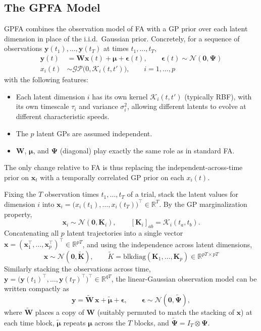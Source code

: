 \documentclass[11pt]{article}
\begin{document}
\subsection*{The GPFA Model}

GPFA combines the observation model of FA with a GP prior over each latent dimension in place of the i.i.d.\ Gaussian prior. Concretely, for a sequence of observations $\mathbf{y}(t_1), \dots, \mathbf{y}(t_T)$ at times $t_1, \dots, t_T$,
\[
\begin{aligned}
\mathbf{y}(t) &= \mathbf{W} \mathbf{x}(t) + \boldsymbol{\mu} + \boldsymbol{\epsilon}(t), \qquad \boldsymbol{\epsilon}(t) \sim \mathcal{N}(\mathbf{0}, \boldsymbol{\Psi}) \\
x_i(t) &\sim \mathcal{GP}\big(0, \mathcal{K}_i(t,t')\big), \qquad i = 1, \dots, p
\end{aligned}
\]
with the following features:
\begin{itemize}
    \item Each latent dimension $i$ has its own kernel $\mathcal{K}_i(t,t')$ (typically RBF), with its own timescale $\tau_i$ and variance $\sigma_i^2$, allowing different latents to evolve at different characteristic speeds.
    \item The $p$ latent GPs are assumed independent.
    \item $\mathbf{W}$, $\boldsymbol{\mu}$, and $\boldsymbol{\Psi}$ (diagonal) play exactly the same role as in standard FA.
\end{itemize}
The only change relative to FA is thus replacing the independent-across-time prior on $\mathbf{x}_t$ with a temporally correlated GP prior on each $x_i(t)$.

Fixing the $T$ observation times $t_1,\dots,t_T$ of a trial, stack the latent values for dimension $i$ into $\mathbf{x}_i = \big(x_i(t_1), \dots, x_i(t_T)\big)^\top \in \mathbb{R}^T$. By the GP marginalization property,
\[
    \mathbf{x}_i \sim \mathcal{N}(\mathbf{0}, \mathbf{K}_i), \qquad [\mathbf{K}_i]_{ab} = \mathcal{K}_i(t_a, t_b).
\]
Concatenating all $p$ latent trajectories into a single vector $\mathbf{x} = (\mathbf{x}_1^\top, \dots, \mathbf{x}_p^\top)^\top \in \mathbb{R}^{pT}$, and using the independence across latent dimensions,
\[
    \mathbf{x} \sim \mathcal{N}(\mathbf{0}, \tilde{\mathbf{K}}), \qquad \tilde{K} = \mathrm{blkdiag}(\mathbf{K}_1, \dots, \mathbf{K}_p) \in \mathbb{R}^{pT \times pT}
\]
Similarly stacking the observations across time, $\mathbf{y} = \big(\mathbf{y}(t_1)^\top, \dots, \mathbf{y}(t_T)^\top\big)^\top \in \mathbb{R}^{qT}$, the linear-Gaussian observation model can be written compactly as
\[
    \mathbf{y} = \tilde{\mathbf{W}}\, \mathbf{x} + \tilde{\boldsymbol{\mu}} + \boldsymbol{\epsilon}, \qquad \boldsymbol{\epsilon} \sim \mathcal{N}(\mathbf{0}, \tilde{\boldsymbol{\Psi}}),
\]
where $\tilde{\mathbf{W}}$ places a copy of $\mathbf{W}$ (suitably permuted to match the stacking of $\mathbf{x}$) at each time block, $\tilde{\boldsymbol{\mu}}$ repeats $\boldsymbol{\mu}$ across the $T$ blocks, and $\tilde{\boldsymbol{\Psi}} = I_T \otimes \boldsymbol{\Psi}$. 
\end{document}
